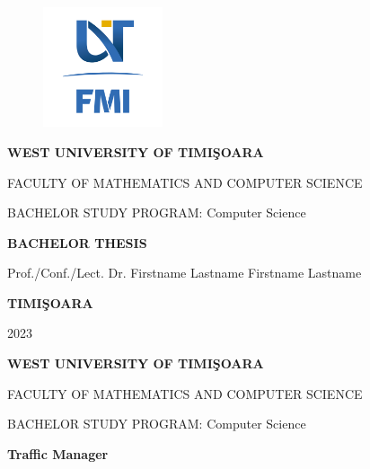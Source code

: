 \documentclass[17pt]{article}
\begin{document}
\thispagestyle{empty}
\begin{center}
\begin{figure}[h!]
\vspace{-20pt}
\begin{center}
\includegraphics[width=100pt]{FMI-03.png}
\end{center}
\end{figure}


{\large{\bf WEST UNIVERSITY OF TIMI\c SOARA

FACULTY OF MATHEMATICS AND COMPUTER SCIENCE

BACHELOR STUDY PROGRAM: Computer Science}}

\vspace{120pt}
{\huge {\bf BACHELOR THESIS}}

\vspace{160pt}
\end{center}

{\large{}

\noindent Prof./Conf./Lect. Dr. Firstname Lastname \hfill 
\noindent  Firstname Lastname
}

\vfill
\begin{center}
{\bf TIMI\c SOARA

2023}
\end{center}
\newpage
\thispagestyle{empty}
\begin{center}
{\large{\bf WEST UNIVERSITY OF TIMI\c SOARA
		
FACULTY OF MATHEMATICS AND COMPUTER SCIENCE
		
BACHELOR STUDY PROGRAM:  Computer Science}}

\vspace{200pt}
{\huge {\bf Traffic Manager }}

\vspace{153pt}
\end{center}
\end{document}
